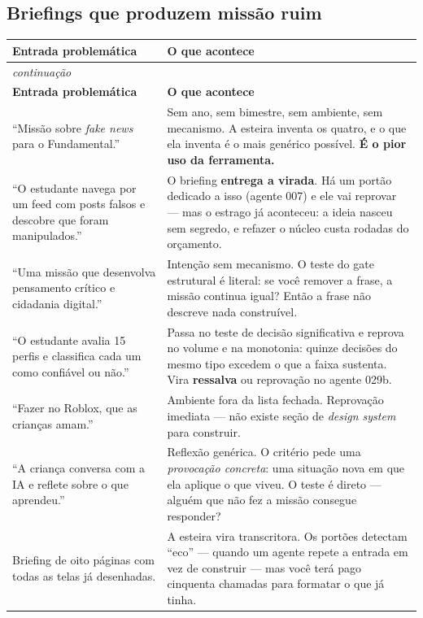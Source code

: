 \documentclass[11pt,a4paper]{article}
\newcommand{\Ambar}[1]{\textcolor{sinalAmbar}{\textbf{#1}}}
\newcommand{\Vermelho}[1]{\textcolor{sinalVermelho}{\textbf{#1}}}
\begin{document}
\subsection{Briefings que produzem missão ruim}

\begin{center}
\begin{longtable}{p{6.4cm}p{8.5cm}}
\toprule
\sffamily\bfseries\footnotesize\color{unNavy}Entrada problemática & \sffamily\bfseries\footnotesize\color{unNavy}O que acontece \\
\midrule
\endfirsthead
\multicolumn{2}{l}{\sffamily\footnotesize\itshape\color{unLavanda}continuação} \\
\toprule
\sffamily\bfseries\footnotesize\color{unNavy}Entrada problemática & \sffamily\bfseries\footnotesize\color{unNavy}O que acontece \\
\midrule
\endhead
``Missão sobre \emph{fake news} para o Fundamental.'' &
Sem ano, sem bimestre, sem ambiente, sem mecanismo. A esteira inventa os quatro, e o que ela inventa é o mais genérico possível. \Vermelho{É o pior uso da ferramenta.} \\
\addlinespace
``O estudante navega por um feed com posts falsos e descobre que foram manipulados.'' &
O briefing \textbf{entrega a virada}. Há um portão dedicado a isso (agente 007) e ele vai reprovar --- mas o estrago já aconteceu: a ideia nasceu sem segredo, e refazer o núcleo custa rodadas do orçamento. \\
\addlinespace
``Uma missão que desenvolva pensamento crítico e cidadania digital.'' &
Intenção sem mecanismo. O teste do gate estrutural é literal: se você remover a frase, a missão continua igual? Então a frase não descreve nada construível. \\
\addlinespace
``O estudante avalia 15 perfis e classifica cada um como confiável ou não.'' &
Passa no teste de decisão significativa e reprova no volume e na monotonia: quinze decisões do mesmo tipo excedem o que a faixa sustenta. Vira \Ambar{ressalva} ou reprovação no agente 029b. \\
\addlinespace
``Fazer no Roblox, que as crianças amam.'' &
Ambiente fora da lista fechada. Reprovação imediata --- não existe seção de \emph{design system} para construir. \\
\addlinespace
``A criança conversa com a IA e reflete sobre o que aprendeu.'' &
Reflexão genérica. O critério pede uma \emph{provocação concreta}: uma situação nova em que ela aplique o que viveu. O teste é direto --- alguém que não fez a missão consegue responder? \\
\addlinespace
Briefing de oito páginas com todas as telas já desenhadas. &
A esteira vira transcritora. Os portões detectam ``eco'' --- quando um agente repete a entrada em vez de construir --- mas você terá pago cinquenta chamadas para formatar o que já tinha. \\
\bottomrule
\end{longtable}
\end{center}
\end{document}
